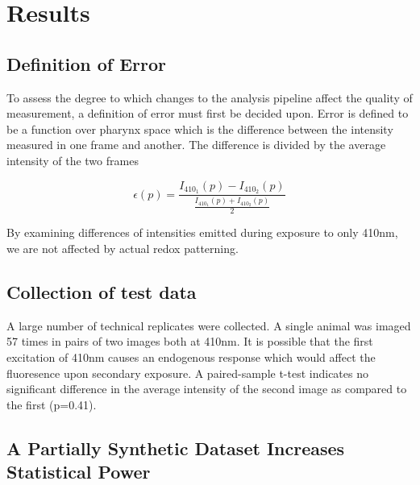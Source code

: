 
\chapter{Results} %

\label{Chapter3} %

\section{Definition of Error}
To assess the degree to which changes to the analysis pipeline affect the quality of measurement, a definition of error must first be decided upon. Error is defined to be a function over pharynx space which is the difference between the intensity measured in one frame and another. The difference is divided by the average intensity of the two frames  

\[\epsilon(p) = \frac{I_{410_1}(p) - I_{410_2}(p)}{\frac{I_{410_1}(p) + I_{410_2}(p)}{2}}\]

By examining differences of intensities emitted during exposure to only 410nm, we are not affected by actual redox patterning.

\section{Collection of test data}

A large number of technical replicates were collected. A single animal was imaged 57 times in pairs of two images both at 410nm.  It is possible that the first excitation of 410nm causes an endogenous response which would affect the fluoresence upon secondary exposure. A paired-sample t-test indicates no significant difference in the average intensity of the second image as compared to the first (p=0.41). 


\section{A Partially Synthetic Dataset Increases Statistical Power}

